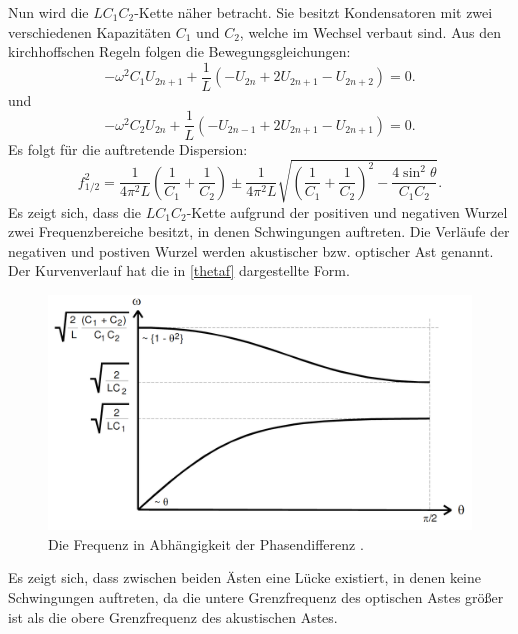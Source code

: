  Nun wird die $LC_1C_2$-Kette näher betracht. Sie besitzt Kondensatoren mit zwei
  verschiedenen Kapazitäten $C_1$ und $C_2$, welche im Wechsel verbaut sind.
 Aus den kirchhoffschen Regeln folgen die Bewegungsgleichungen:
 \begin{equation}
   -\omega^2 C_1 U_{2n+1} + \frac{1}{L} \left( -U_{2n} + 2U_{2n+1} - U_{2n+2} \right) = 0\text{.}
 \end{equation}
 und
 \begin{equation}
   -\omega^2 C_2 U_{2n} + \frac{1}{L} \left( -U_{2n-1} + 2U_{2n+1} - U_{2n+1} \right) = 0\text{.}
 \end{equation}
Es folgt für die auftretende Dispersion:
\begin{equation}
  f_{1/2}^2 = \frac{1}{4\pi^2L}\left(\frac{1}{C_1}+\frac{1}{C_2}\right) \pm \frac{1}{4\pi^2L}\sqrt{\left(\frac{1}{C_1}+\frac{1}{C_2} \right)^2 - \frac{4 \sin^2\theta}{C_1C_2}}\text{.}
\end{equation}
Es zeigt sich, dass die $LC_1C_2$-Kette aufgrund der positiven und negativen Wurzel
zwei Frequenzbereiche besitzt, in denen Schwingungen auftreten. Die Verläufe der
 negativen und postiven Wurzel werden akustischer bzw. optischer Ast genannt.
 Der Kurvenverlauf hat die in \ref{thetaf} dargestellte Form.
 \begin{figure}[H]
   \centering
   \includegraphics[width=\linewidth-100pt,height=\textheight-100pt,keepaspectratio]{content/Grafiken/Dispersionskurven.png}
   \caption{Die Frequenz in Abhängigkeit der Phasendifferenz \cite{V356}.}
   \label{fig:thetaf}
 \end{figure}
 Es zeigt sich, dass zwischen beiden Ästen eine Lücke existiert,
  in denen keine Schwingungen auftreten, da die untere Grenzfrequenz des
   optischen Astes größer ist als die obere Grenzfrequenz des akustischen Astes.

